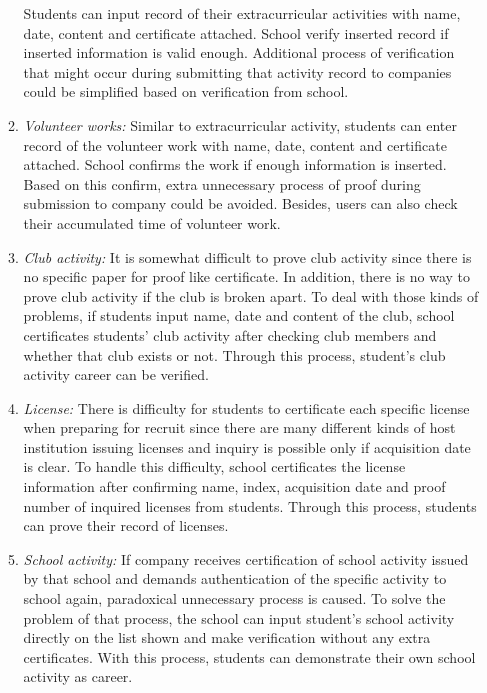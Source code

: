\documentclass[conference]{IEEEtran}
\begin{document}
\begin{enumerate}
\begin{enumerate}
	Students can input record of their extracurricular activities with name, date, content and certificate attached. School verify inserted record if inserted information is valid enough. Additional process of verification that might occur during submitting that activity record to companies could be simplified based on verification from school.\\
        \item \textit{Volunteer works:} Similar to extracurricular activity, students can enter record of the volunteer work with name, date, content and certificate attached. School confirms the work if enough information is inserted. Based on this confirm, extra unnecessary process of proof during submission to company could be avoided. Besides, users can also check their accumulated time of volunteer work.\\
        \item \textit{Club activity:} It is somewhat difficult to prove club activity since there is no specific paper for proof like certificate. In addition, there is no way to prove club activity if the club is broken apart. To deal with those kinds of problems, if students input name, date and content of the club, school certificates students’ club activity after checking club members and whether that club exists or not. Through this process, student’s club activity career can be verified. \\
        \item \textit{License:} There is difficulty for students to certificate each specific license when preparing for recruit since there are many different kinds of host institution issuing licenses and inquiry is possible only if acquisition date is clear. To handle this difficulty, school certificates the license information after confirming name, index, acquisition date and proof number of inquired licenses from students. Through this process, students can prove their record of licenses.\\
        \item \textit{School activity:} If company receives certification of school activity issued by that school and demands authentication of the specific activity to school again, paradoxical unnecessary process is caused. To solve the problem of that process, the school can input student’s school activity directly on the list shown and make verification without any extra certificates. With this process, students can demonstrate their own school activity as career.\\

\end{enumerate}
\end{enumerate}
\end{document}
